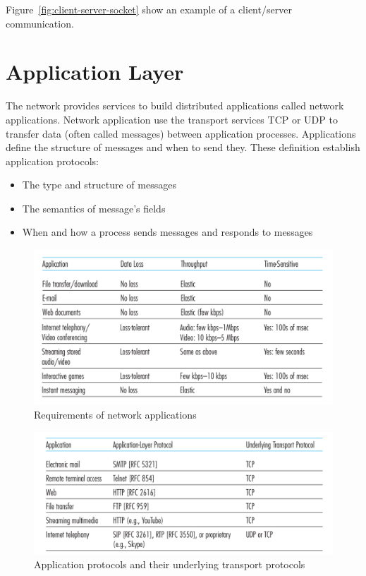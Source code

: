 \documentclass[a4paper, 11pt]{article}
\begin{document}
Figure~\ref{fig:client-server-socket} show an example of a client/server communication.

\clearpage
\section{Application Layer}
The network provides services to build distributed applications called network applications. Network application use the transport services TCP or UDP to transfer data (often called messages) between application processes. Applications define the structure of messages and when to send they. These definition establish application protocols:
\begin{itemize}
\item The type and structure of messages
\item The semantics of message's fields
\item When and how a process sends messages and responds to messages
\end{itemize}

\begin{figure}[h]
\includegraphics[scale=0.6]{application-requirement.png}
\caption{Requirements of network applications}
\label{fig:application-requirement}
\end{figure}

\begin{figure}[h]
\includegraphics[scale=0.6]{application-protocols.png}
\caption{Application protocols and their underlying transport protocols}
\label{fig:application-protocol}
\end{figure}
\end{document}
